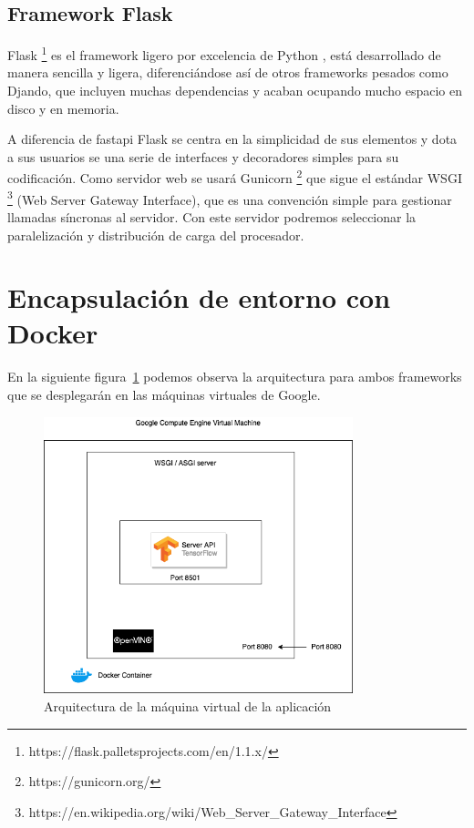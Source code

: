\subsection{Framework Flask}\label{subsec:framework-flask}
Flask \footnote{https://flask.palletsprojects.com/en/1.1.x/} es el framework ligero por excelencia de Python , está desarrollado de manera sencilla y ligera, diferenciándose así de otros frameworks pesados como Djando, que incluyen
muchas dependencias y acaban ocupando mucho espacio en disco y en memoria.

A diferencia de fastapi Flask se centra en la simplicidad de sus elementos y dota a sus usuarios se una serie de interfaces y decoradores simples para su codificación.
Como servidor web se usará Gunicorn \footnote{https://gunicorn.org/} que sigue el estándar WSGI \footnote{https://en.wikipedia.org/wiki/Web_Server_Gateway_Interface} (Web Server Gateway Interface), que es una convención simple para gestionar llamadas síncronas al servidor.
Con este servidor podremos seleccionar la paralelización y distribución de carga del procesador.


\section{Encapsulación de entorno con Docker}\label{sec:encapsulación-de-entorno-con-docker}
En la siguiente figura~\ref{fig:Arquitectura de la máquina virtual de la aplicación} podemos observa la arquitectura para ambos frameworks que se desplegarán en las máquinas virtuales de Google.

\begin{figure}
    \centering
    \includegraphics[width=0.8\textwidth]{images/chapter4/host_architecture.png}
    \caption{Arquitectura de la máquina virtual de la aplicación}
    \label{fig:Arquitectura de la máquina virtual de la aplicación}
\end{figure}

